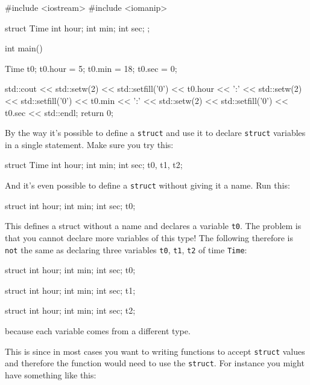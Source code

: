 \begin{center}
\begin{center}
\begin{consolethree}[escapeinside=||]
#include <iostream>
#include <iomanip>

struct Time
{
    int hour;
    int min;
    int sec;
};

int main()
{
    Time t0;
    t0.hour = 5;
    t0.min = 18;
    t0.sec = 0;

    std::cout << std::setw(2) << std::setfill('0')
              << t0.hour << ':'
              << std::setw(2) << std::setfill('0')
              << t0.min << ':'
              << std::setw(2) << std::setfill('0')
              << t0.sec
              << std::endl;
    return 0;
}
\end{consolethree}

By the way it's possible to define a \texttt{struct} and use it to declare \texttt{struct}
variables in a single statement. Make sure you try this:

\begin{consolethree}[escapeinside=||]
struct Time
{
    int hour;
    int min;
    int sec;
} t0, t1, t2;
\end{consolethree}

And it's even possible to define a \texttt{struct} without giving it a name. Run
this:

\begin{consolethree}[escapeinside=||]
struct
{
    int hour;
    int min;
    int sec;
} t0;
\end{consolethree}

This defines a struct without a name and declares a variable \texttt{t0}.
The problem is that you cannot declare more variables of this type! The
following therefore is \texttt{not} the same as declaring three variables
\texttt{t0}, \texttt{t1}, \texttt{t2} of time \texttt{Time}:

\begin{consolethree}[escapeinside=||]
struct
{
    int hour;
    int min;
    int sec;
} t0;

struct
{
    int hour;
    int min;
    int sec;
} t1;

struct
{
    int hour;
    int min;
    int sec;
} t2;
\end{consolethree}

because each variable comes from a different type.

This is  since in most cases you want to writing
functions to accept \texttt{struct} values and therefore the function would
need to use the \texttt{struct}. For instance you might have something like
this:


\end{center}
\end{center}
